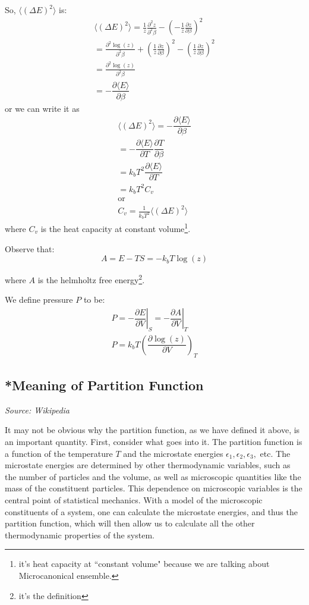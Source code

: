 \documentclass{tufte-handout}
\begin{document}
So, \(\langle (\Delta E)^2 \rangle\) is:
\[\begin{gathered}
	\langle (\Delta E)^2 \rangle = \frac{1}{z} \frac{\partial^2 z}{\partial^2 \beta} 
	- \left(-\frac{1}{z} \frac{\partial z}{\partial\beta}\right)^2\\
	=  \frac{\partial^2 \log(z)}{\partial^2 \beta} + \left(\frac{1}{z} 
	\frac{\partial z}{\partial\beta}\right)^2
	-\left(\frac{1}{z} \frac{\partial z}{\partial\beta}\right)^2\\
	= \frac{\partial^2 \log(z)}{\partial^2 \beta}\\
	= - \dfrac{\partial \langle E \rangle}{\partial \beta}
\end{gathered}\]
or we can write it as 
\[\begin{gathered}
	\langle (\Delta E)^2 \rangle = - \dfrac{\partial \langle E \rangle}{\partial \beta}\\
	= - \dfrac{\partial \langle E \rangle}{\partial T}\dfrac{\partial T}{\partial \beta}\\
	= k_b T^2\dfrac{\partial \langle E \rangle}{\partial T}\\
	= k_b T^2 C_v\\
	\text{or}\\
	\boxed{C_v = \frac{1}{k_b T^2} \langle (\Delta E)^2 \rangle}
\end{gathered}\]
where \(C_v\) is the heat capacity at constant volume\footnote{it's heat capacity at ``constant volume"
because we are talking about Microcanonical
ensemble.}. 

Observe that: 
\[A =  E - TS= -k_b T \log(z)\]

where \(A\) is the helmholtz free energy\footnote{it's the definition}. 

We define pressure \(P\) to be:
\[\begin{gathered}
	P = \left. -\dfrac{\partial E}{\partial V} \right|_{S} 
= \left. -\dfrac{\partial A}{\partial V} \right|_{T}\\
\boxed{P =  k_b T \left (\dfrac{\partial \log(z)}{\partial V} \right ) _{T} } \tag*{1}
\end{gathered}\]
\subsection{*Meaning of Partition Function}

\textit{Source: Wikipedia}


It may not be obvious why the partition function, as we have defined it above, is an important 
quantity. First, consider what goes into it. The partition function is a function of the temperature 
\(T\) and the microstate energies \(\epsilon_1, \epsilon_2, \epsilon_3, \) etc. 
The microstate energies are determined by other 
thermodynamic variables, such as the number of particles and the volume, as well as microscopic 
quantities like the mass of the constituent particles. This dependence on microscopic variables 
is the central point of statistical mechanics. With a model of the microscopic constituents of 
a system, one can calculate the microstate energies, and thus the partition function, which will 
then allow us to calculate all the other thermodynamic properties of the system.
\end{document}
